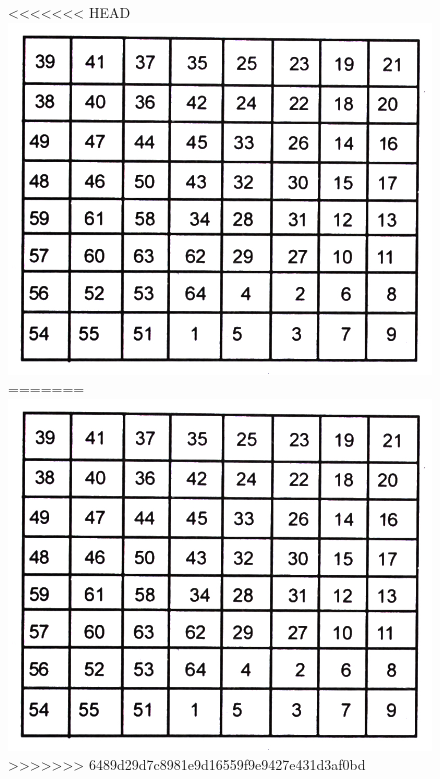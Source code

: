 \begin{figure}[H]
<<<<<<< HEAD
\includegraphics{src/figures/chap6/fig6-13.jpg}
=======
\includegraphics[scale=0.85]{src/figures/chap6/fig6.13.jpg}
>>>>>>> 6489d29d7c8981e9d16559f9e9427e431d3af0bd
\end{figure}

